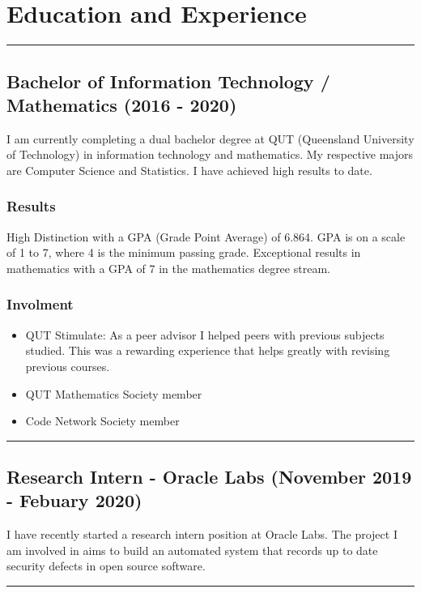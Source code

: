 \section*{Education and Experience}
\noindent\rule{\textwidth}{0.5pt}
\subsection*{Bachelor of Information Technology / Mathematics (2016 - 2020)}

I am currently completing a dual bachelor degree at QUT (Queensland University of Technology) in information technology and mathematics. My respective majors are Computer Science and Statistics. I have achieved high results to date.

\subsubsection*{Results}

High Distinction with a GPA (Grade Point Average) of 6.864. GPA is on a scale of 1 to 7, where 4 is the minimum passing grade. Exceptional results in mathematics with a GPA of 7 in the mathematics degree stream.

\subsubsection*{Involment}

\begin{itemize}
  \item QUT Stimulate: As a peer advisor I helped peers with previous subjects studied. This was a rewarding experience that helps greatly with revising previous courses.
  \item QUT Mathematics Society member
  \item Code Network Society member
\end{itemize}

\noindent\rule{\textwidth}{0.5pt}

\subsection*{Research Intern - Oracle Labs (November 2019 - Febuary 2020)}

I have recently started a research intern position at Oracle Labs. The project I am involved in aims to build an automated system that records up to date security defects in open source software.

\noindent\rule{\textwidth}{0.5pt}

